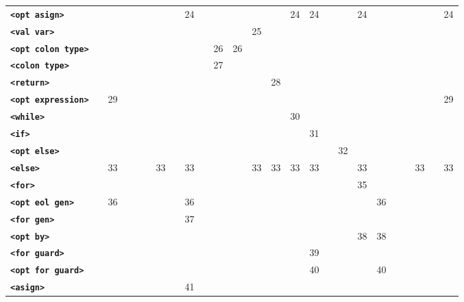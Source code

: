 \documentclass{article}
\begin{document}
\begin{table}[H]
{\begin{minipage}{0.88\textheight}
{\begin{tabular}{l *{24}{c}}
    \textbf{\large\texttt{<opt asign>}} & & & & & & & & {\large 24} & & & & & & {\large 24} & {\large 24} & & & {\large 24} & & & & & & {\large 24} \\
    \textbf{\large\texttt{<val var>}} & & & & & & & & & & & & {\large 25} & & & & & & & & & & & & \\
    \textbf{\large\texttt{<opt colon type>}} & & & & & & & & & & {\large 26} & {\large 26} & & & & & & & & & & & & & \\
    \textbf{\large\texttt{<colon type>}} & & & & & & & & & & {\large 27} & & & & & & & & & & & & & & \\
    \textbf{\large\texttt{<return>}} & & & & & & & & & & & & & {\large 28} & & & & & & & & & & & \\
    \textbf{\large\texttt{<opt expression>}} & & {\large 29} & & & & & & & & & & & & & & & & & & & & & & {\large 29} \\
    \textbf{\large\texttt{<while>}} & & & & & & & & & & & & & & {\large 30} & & & & & & & & & & \\
    \textbf{\large\texttt{<if>}} & & & & & & & & & & & & & & & {\large 31} & & & & & & & & & \\
    \textbf{\large\texttt{<opt else>}} & & & & & & & & & & & & & & & & & {\large 32} & & & & & & & \\
    \textbf{\large\texttt{<else>}} & & {\large 33} & & & & {\large 33} & & {\large 33} & & & & {\large 33} & {\large 33} & {\large 33} & {\large 33} & & & {\large 33} & & & & {\large 33} & & {\large 33} \\
    \textbf{\large\texttt{<for>}} & & & & & & & & & & & & & & & & & & {\large 35} & & & & & & \\
    \textbf{\large\texttt{<opt eol gen>}} & & {\large 36} & & & & & & {\large 36} & & & & & & & & & & & {\large 36} & & & & & \\
    \textbf{\large\texttt{<for gen>}} & & & & & & & & {\large 37} & & & & & & & & & & & & & & & & \\
    \textbf{\large\texttt{<opt by>}} & & & & & & & & & & & & & & & & & & {\large 38} & {\large 38} & & & & & \\
    \textbf{\large\texttt{<for guard>}} & & & & & & & & & & & & & & & {\large 39} & & & & & & & & & \\
    \textbf{\large\texttt{<opt for guard>}} & & & & & & & & & & & & & & & {\large 40} & & & & {\large 40} & & & & & \\
    \textbf{\large\texttt{<asign>}} & & & & & & & & {\large 41} & & & & & & & & & & & & & & & & \\
    \bottomrule
    \end{tabular}%
  }
  \end{minipage}%
}
\end{table}
\end{document}
